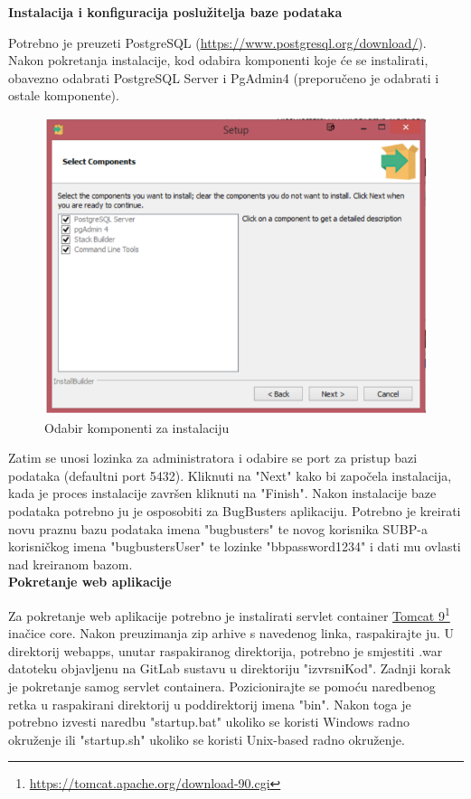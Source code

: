 	 \textbf{Instalacija i konfiguracija poslužitelja baze podataka}
		
			Potrebno je preuzeti PostgreSQL (\underline{\url{https://www.postgresql.org/download/}}). Nakon pokretanja instalacije, kod odabira komponenti koje će se instalirati, obavezno odabrati PostgreSQL Server i PgAdmin4 (preporučeno je odabrati i ostale komponente).
			
			\begin{figure}[H]
				\includegraphics[scale=0.65]{Slike/Instalacija.png}
				\centering
				\caption{Odabir komponenti za instalaciju}
				\label{fig:dijagram}
			\end{figure}
			
			Zatim se unosi lozinka za administratora i odabire se port za pristup bazi podataka (defaultni port 5432). Kliknuti na "Next" kako bi započela instalacija, kada je proces instalacije završen kliknuti na "Finish". \newline
			Nakon instalacije baze podataka potrebno ju je osposobiti za BugBusters aplikaciju. Potrebno je kreirati novu praznu bazu podataka imena "bugbusters" te novog korisnika SUBP-a korisničkog imena "bugbustersUser" te lozinke "bbpassword1234" i dati mu ovlasti nad kreiranom bazom.
			\\
			 
	\textbf{Pokretanje web aplikacije}
		
		Za pokretanje web aplikacije potrebno je instalirati servlet container \underline{Tomcat 9}\footnote{\url{https://tomcat.apache.org/download-90.cgi}} inačice core. Nakon preuzimanja zip arhive s navedenog linka, raspakirajte ju. U direktorij webapps, unutar raspakiranog direktorija, potrebno je smjestiti .war datoteku objavljenu na GitLab sustavu u direktoriju "izvrsniKod". Zadnji korak je pokretanje samog servlet containera. Pozicionirajte se pomoću naredbenog retka u raspakirani direktorij u poddirektorij imena "bin". Nakon toga je potrebno izvesti naredbu "startup.bat" ukoliko se koristi Windows radno okruženje ili "startup.sh" ukoliko se koristi Unix-based radno okruženje.
		\\
	
